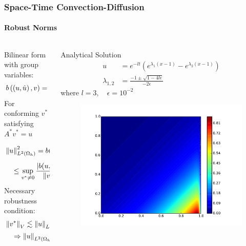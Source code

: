 \documentclass[18pt,xcolor=table]{beamer}
\begin{document}
\begin{frame}[t]
\frametitle{Space-Time Convection-Diffusion}
\framesubtitle{Robust Norms}
\begin{columns}[t]
\begin{column}{0.5\textwidth}
\vspace{-3ex}

Bilinear form with group variables:
\[
b\left( \left( u,\hat u \right),v \right) = \left( u,A^*_h v \right)_{L^2\left( \Omega_h \right)} + \left\langle \widehat{u}, \left[ \![v]\! \right] \right\rangle_{\Gamma_h}
\]
For conforming $v^*$ satisfying $A^* v^* = u$
\begin{align*}
&\left\| u \right\|_{L^2\left( \Omega_h \right)}^2= b(u,v^*)
=\frac{b(u,v^*)}{\left\| v^* \right\|_V} \left\| v^* \right\|_V\\
&\quad\leq\sup_{v^*\neq0}\frac{|b(u,v^*)|}{\left\| v^* \right\|}\left\| v^* \right\|
=\left\| u \right\|_E \left\| v^* \right\|_V
\end{align*}
Necessary robustness condition:
\begin{align*}
&\left\| v^* \right\|_V\lesssim\left\| u \right\|_{L^2(\Omega_h)}\\
&\quad\Rightarrow\left\| u \right\|_{L^2(\Omega_h)}\lesssim\left\| u \right\|_E
\end{align*}
\end{column}
\begin{column}{0.5\textwidth}
\vspace{-3ex}
\centering

Analytical Solution
\begin{align*}
u&=e^{-lt}(e^{\lambda_1(x-1)}-e^{\lambda_2(x-1)})\\
\lambda_{1,2}&=\frac{-1\pm\sqrt{1-4l\epsilon}}{-2\epsilon}
\end{align*}
where $l=3, \quad\epsilon = 10^{-2}$
\vspace{-3ex}
\begin{figure}[t]
\centering
\includegraphics[width=\textwidth]{figs/SpaceTimeAnalyticalExact}
\end{figure}
\end{column}
\end{columns}
\end{frame}
\end{document}
